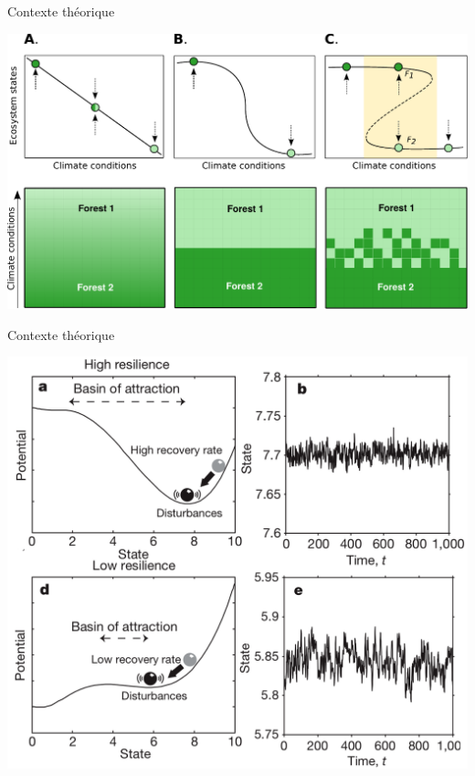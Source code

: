 \documentclass[10pt,aspectratio=149]{beamer}
\begin{document}

   \begin{frame}{Contexte théorique}
      \begin{center}
      \includegraphics[height=0.6\textheight]{Figs/states}\\
      \end{center}
   \end{frame}



   \begin{frame}{Contexte théorique}
      \begin{center}
      \includegraphics[height=0.6\textheight]{Figs/early_warnings}\\
      \end{center}
   \end{frame}
\end{document}
